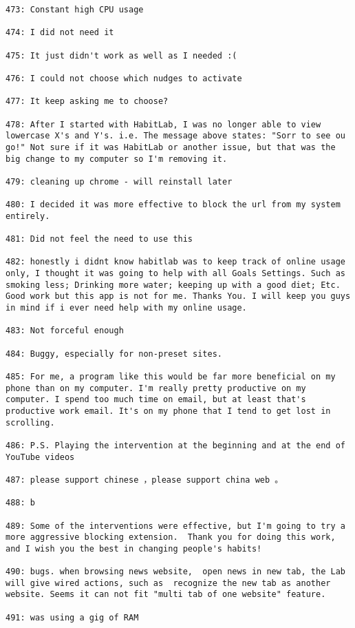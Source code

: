 \begin{lstlisting}[breaklines]
473: Constant high CPU usage

474: I did not need it

475: It just didn't work as well as I needed :(

476: I could not choose which nudges to activate

477: It keep asking me to choose?

478: After I started with HabitLab, I was no longer able to view lowercase X's and Y's. i.e. The message above states: "Sorr to see ou go!" Not sure if it was HabitLab or another issue, but that was the big change to my computer so I'm removing it.

479: cleaning up chrome - will reinstall later

480: I decided it was more effective to block the url from my system entirely.

481: Did not feel the need to use this

482: honestly i didnt know habitlab was to keep track of online usage only, I thought it was going to help with all Goals Settings. Such as smoking less; Drinking more water; keeping up with a good diet; Etc. Good work but this app is not for me. Thanks You. I will keep you guys in mind if i ever need help with my online usage.

483: Not forceful enough

484: Buggy, especially for non-preset sites.

485: For me, a program like this would be far more beneficial on my phone than on my computer. I'm really pretty productive on my computer. I spend too much time on email, but at least that's productive work email. It's on my phone that I tend to get lost in scrolling.

486: P.S. Playing the intervention at the beginning and at the end of YouTube videos

487: please support chinese ，please support china web 。

488: b

489: Some of the interventions were effective, but I'm going to try a more aggressive blocking extension.  Thank you for doing this work, and I wish you the best in changing people's habits!

490: bugs. when browsing news website,  open news in new tab, the Lab will give wired actions, such as  recognize the new tab as another website. Seems it can not fit "multi tab of one website" feature.

491: was using a gig of RAM


\end{lstlisting}
